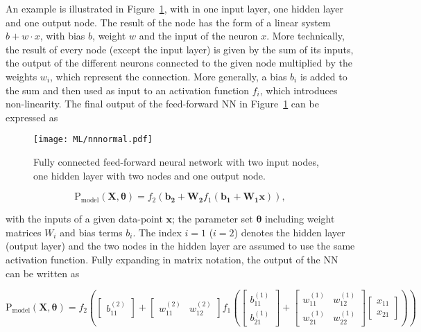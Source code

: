 An example is illustrated in Figure~\ref{ML:normalNN}, with in one input layer, one hidden layer and one output node. The result of the node has the form of a linear system $b+w\cdot x$, with bias $b$, weight $w$ and the input of the neuron $x$. More technically, the result of every node (except the input layer) is given by the sum of its inputs, the output of the different neurons connected to the given node multiplied by the weights $w_i$, which represent the connection. More generally, a bias $b_i$ is added to the sum and then used as input to an activation function $f_i$, which introduces non-linearity. The final output of the feed-forward NN in Figure~\ref{ML:normalNN} can be expressed as

\begin{figure}[htbp]
    \RawFloats
    \begin{center}
    \texttt{[image: ML/nnnormal.pdf]}
    \caption{
        Fully connected feed-forward neural network with two input nodes, one hidden layer with two nodes and one output node.
    }
    \label{ML:normalNN}
    \end{center}
\end{figure}

\begin{equation}
    \text{P}_\text{model}(\mathbf{X},\boldsymbol{\theta}) = f_2(\mathbf{b_2}+\mathbf{W_2}f_1(\mathbf{b_1}+\mathbf{W_1}\mathbf{x})),
\end{equation}

with the inputs of a given data-point $\mathbf{x}$; the parameter set $\boldsymbol{\theta}$ including weight matrices $W_i$ and bias terms $b_i$. The index $i=1$ ($i=2$) denotes the hidden layer (output layer) and the two nodes in the hidden layer are assumed to use the same activation function. Fully expanding in matrix notation, the output of the NN can be written as

\begin{equation}
    \text{P}_\text{model}(\mathbf{X},\boldsymbol{\theta}) = f_2\left( \begin{bmatrix} b_{11}^{(2)} \end{bmatrix}+ \begin{bmatrix} w_{11}^{(2)} & w_{12}^{(2)}\end{bmatrix}f_1\left( \begin{bmatrix} b_{11}^{(1)} \\  
                                                            b_{21}^{(1)}  \end{bmatrix}+ \begin{bmatrix} 
    w_{11}^{(1)} & w_{12}^{(1)} \\ 
    w_{21}^{(1)} & w_{22}^{(1)}\end{bmatrix} \begin{bmatrix}
        x_{11}\\
        x_{21}
    \end{bmatrix} \right) \right)
\end{equation}

